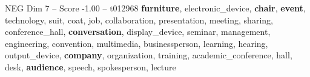 \begin{textsample}{NEG Dim 7 – Score -1.00 – t012968}  \label{ex:f7_neg_022}
\textbf{furniture}, electronic\_device, \textbf{chair}, \textbf{event}, technology, suit, coat, job, collaboration, presentation, meeting, sharing, conference\_hall, \textbf{conversation}, display\_device, seminar, management, engineering, convention, multimedia, businessperson, learning, hearing, output\_device, \textbf{company}, organization, training, academic\_conference, hall, desk, \textbf{audience}, speech, spokesperson, lecture

\end{textsample}
